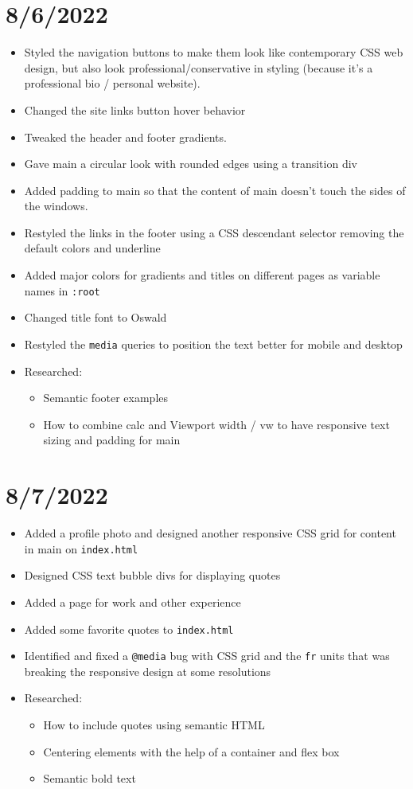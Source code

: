 \documentclass{article}
\begin{document}
\section*{8/6/2022}
\begin{itemize}
	\item Styled the navigation buttons to make them look like contemporary CSS web design, but also look professional/conservative in styling (because it's a professional bio / personal website).
	\item Changed the site links button hover behavior 
	\item Tweaked the header and footer gradients.
	\item Gave main a circular look with rounded edges using a transition div
	\item Added padding to main so that the content of main doesn't touch the sides of the windows.
	\item Restyled the links in the footer using a CSS descendant selector removing the default colors and underline
	\item Added major colors for gradients and titles on different pages as variable names in
	 \texttt{:root} 
	\item Changed title font to Oswald
	\item Restyled the \texttt{media} queries to position the text better for mobile and desktop
	\item Researched:
		\begin{itemize} 
	 			\item Semantic footer examples
	 			\item How to combine calc and Viewport width / vw to have responsive text sizing and padding for main
		\end{itemize}
\end{itemize}


\section*{8/7/2022}
\begin{itemize}
	\item Added a profile photo and designed another responsive CSS grid for content in main on \texttt{index.html}
	\item Designed CSS text bubble divs for displaying quotes
	\item Added a page for work and other experience
	\item Added some favorite quotes to \texttt{index.html}
	\item Identified and fixed a \texttt{@media} bug with CSS grid and the \texttt{fr} units that was breaking the responsive design at some resolutions
	\item Researched:
		\begin{itemize} 
	 			\item How to include quotes using semantic HTML
	 			\item Centering elements with the help of a container and flex box
	 			\item Semantic bold text
		\end{itemize}
\end{itemize}
\end{document}
